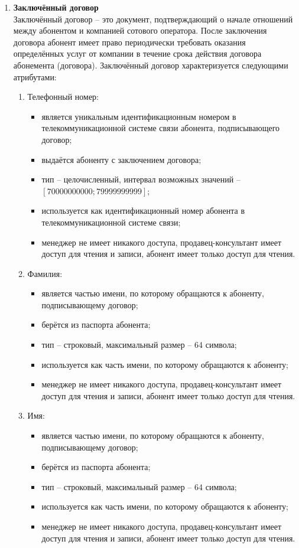 \begin{enumerate}
    \item \textbf{Заключённый договор} \\
    Заключённый договор -- это документ, подтверждающий о начале отношений между абонентом и компанией сотового оператора. После заключения договора абонент имеет право периодически требовать оказания определённых услуг от компании в течение срока действия договора абонемента (договора). Заключённый договор характеризуется следующими атрибутами:
    \begin{enumerate}
        \item Телефонный номер:
        \begin{itemize}
            \item является уникальным идентификационным номером в телекоммуникационной системе связи абонента, подписывающего договор;
            \item выдаётся абоненту с заключением договора;
            \item тип -- целочисленный, интервал возможных значений -- $[70000000000; 79999999999]$;
            \item используется как идентификационный номер абонента в телекоммуникационной системе связи;
            \item менеджер не имеет никакого доступа, продавец-консультант имеет доступ для чтения и записи, абонент имеет только доступ для чтения.
        \end{itemize}

        \item Фамилия:
        \begin{itemize}
            \item является частью имени, по которому обращаются к абоненту, подписывающему договор;
            \item берётся из паспорта абонента;
            \item тип -- строковый, максимальный размер -- 64 символа;
            \item используется как часть имени, по которому обращаются к абоненту;
            \item менеджер не имеет никакого доступа, продавец-консультант имеет доступ для чтения и записи, абонент имеет только доступ для чтения.
        \end{itemize}

        \item Имя:
        \begin{itemize}
            \item является частью имени, по которому обращаются к абоненту, подписывающему договор;
            \item берётся из паспорта абонента;
            \item тип -- строковый, максимальный размер -- 64 символа;
            \item используется как часть имени, по которому обращаются к абоненту;
            \item менеджер не имеет никакого доступа, продавец-консультант имеет доступ для чтения и записи, абонент имеет только доступ для чтения.
        \end{itemize}


\end{enumerate}
\end{enumerate}
